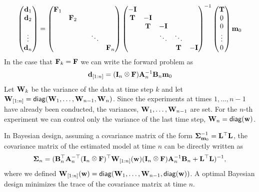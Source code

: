 \documentclass[12pt]{article}
\newcommand{\bfA}	{{\bf{A}}}
\newcommand{\bfB}	{{\bf{B}}}
\newcommand{\bfF}	{{\bf{F}}}
\newcommand{\bfI}	{{\bf{I}}}
\newcommand{\bfL}	{{\bf{L}}}
\newcommand{\bfT}	{{\bf{T}}}
\newcommand{\bfW}	{{\bf{W}}}
\newcommand{\bfd}	{{\bf{d}}}
\newcommand{\bfm}	{{\bf{m}}}
\newcommand{\bfw}	{{\bf{w}}}
\newcommand{\bfSigma}   {{\boldsymbol \Sigma}}
\def\kronecker{\raisebox{1pt}{\ensuremath{\:\otimes\:}}}
\begin{document}
\begin{eqnarray}
\label{foralltimes}
\begin{pmatrix}
\bfd_{1} \\ \bfd_{2} \\ \   \\  \vdots \\ \bfd_{n}
\end{pmatrix} = 
\begin{pmatrix}
\bfF_{1}      &           &         &        &        \\
     & \bfF_{2}      &         &        &        \\
           &  &      &        &        \\
	  &           &   & \ddots &        \\
	 &           &         &     & \bfF_{n}   \\
\end{pmatrix}
\begin{pmatrix}
- \bfI      &           &         &        &        \\
 \bfT     & -\bfI      &         &        &        \\
           &  \bfT & -\bfI    &        &        \\
	  &           &  \ddots & \ddots &        \\
	 &           &         & \bfT    & -\bfI   \\
\end{pmatrix}^{-1}
\begin{pmatrix}
\bfT \\ 0  \\ 0\\ \vdots \\ 0
\end{pmatrix}
\bfm_{0}
\end{eqnarray}
In the case that $\bfF_{k} = \bfF$ we can write the forward problem as
\begin{eqnarray}
\label{dalltimes}
\bfd_{[1:n]} = (\bfI_{n} \kronecker \bfF) \bfA_{n}^{-1} \bfB_{n} \bfm_0
\end{eqnarray}
Let $\bfW_{k}$ be the variance of the data at time step $k$ and let
$\bfW_{[1:n]} = {\sf diag}(\bfW_{1},\ldots,\bfW_{n-1}, \bfW_{n})$. Since the experiments at times
$1,\ldots,n-1$ have already been conducted, the variances, $\bfW_{1}, \ldots, \bfW_{n-1}$ are
set. For the $n$-th experiment we can control only the variance of the last time step, $\bfW_{n} = {\sf diag}(\bfw)$.

In Bayesian design, assuming a covariance matrix of the form $\bfSigma_{\bfm_{0}}^{-1} = \bfL^{\top} \bfL$,
the covariance matrix of the estimated model at time $n$ can be directly written as
\begin{eqnarray}
\label{covapost}
\bfSigma_{n} = (\bfB_{n}^{\top}\bfA_{n}^{-\top} (\bfI_{n} \kronecker \bfF)^{\top} \bfW_{[1:n]}(\bfw) (\bfI_{n} \kronecker \bfF) \bfA_{n}^{-1} \bfB_{n} + \bfL^{\top}\bfL)^{-1},
\end{eqnarray}
where we defined $\bfW_{[1:n]}(\bfw) = {\sf diag}(\bfW_{1},\ldots,\bfW_{n-1}, {\sf diag}(\bfw) )$.
 A optimal Bayesian design minimizes the trace of the covariance matrix at time $n$.
 
\end{document}
